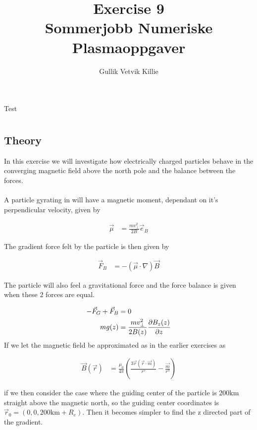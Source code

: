 \documentclass[x11names]{article}
\title{ Exercise 9 \\ Sommerjobb Numeriske Plasmaoppgaver }
\author{Gullik Vetvik Killie
		}
\renewcommand{\va}{\vec}
\begin{document}
\maketitle
Test

\section{}

\subsection{Theory}
  In this exercise we will investigate how electrically charged particles behave in the converging magnetic field above the north pole and the balance between the forces.
\\ \\
  A particle gyrating in will have a magnetic moment, dependant on it's perpendicular velocity, given by

  \begin{align}
    \va{\mu} &= \frac{mv_\perp^2}{2B} \va{e}_B
  \end{align}

  The gradient force felt by the particle is then given by

  \begin{align}
    \va{F}_B &= -\left( \va{\mu}\cdot\nabla \right)\va{B}
  \end{align}

  The particle will also feel a gravitational force and the force balance is given when these 2 forces are equal.

  \begin{align}
    -\va{F}_G + \va{F}_B &= 0  
    \\
    mg(z) &= \frac{mv_\perp^2}{2B(z)} \pdv{B_z(z)}{z}
  \end{align}
  \noindent If we let the magnetic field be approximated as in the earlier exercises as

  \begin{align}
    \va{B}(\va{r}) &= \frac{\mu_0}{4\pi}\left( \frac{3\va{r}(\va{r}\cdot\va{m}  )}{r^5} - \frac{\va{m}}{r^3} \right)
  \end{align}

  \noindent if we then consider the case where the guiding center of the particle is \(200 \si{\kilo\meter}\) straight above the magnetic north, so the guiding center coordinates is
  \( \va{r}_0 = (0,0,200\si{\kilo\meter} + R_e)\). Then it becomes simpler to find the z directed part of the gradient.
\end{document}
